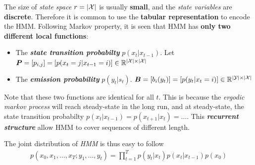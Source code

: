 \documentclass[11pt]{article}
\begin{document}
The size of \emph{state space} $r = |{\mathcal X}|$ is usually \textbf{small}, and the \emph{state variables} are \textbf{discrete}. Therefore it is common to use the \textbf{tabular representation} to encode the HMM. Following Markov property, it is seen that HMM has \textbf{only two different local functions}: 
\begin{itemize}
\item The \textbf{\emph{state transition probabilty}} $p(x_{t}|x_{t-1})$. Let $\boldsymbol{P} = [p_{i,j}] = [p(x_{t}= j|x_{t-1} = i)] \in {\mathbb R}^{|{\mathcal X}| \times |{\mathcal X}|}$

\item The \textbf{\emph{emission probability}} $p(y_t|s_{t})$. $\boldsymbol{B} = [b_{i}(y_t)] =  [p(y_t  | x_t = i)] \in {\mathbb R}^{|{\mathcal Y}| \times |{\mathcal X}|}$
\end{itemize} Note that these two functions are identical for all $t$. This is because the \emph{ergodic markov process} will reach steady-state in the long run, and at steady-state, the state transition probabilty  $p(x_t| x_{t-1}) = p(x_{t+1}| x_{t}) = \ldots$. This \emph{\textbf{recurrent structure}} allow HMM to cover sequences of different length.  
 
The joint distribution of \emph{HMM} is thus easy to follow
\begin{align}
p(x_0, x_1, \ldots, x_T ; y_1, \ldots, y_t) = \prod_{t=1}^{T}p(y_t | x_t)p(x_t| x_{t-1})p(x_{0})    \label{eqn: hmm}
\end{align}  
\end{document}
